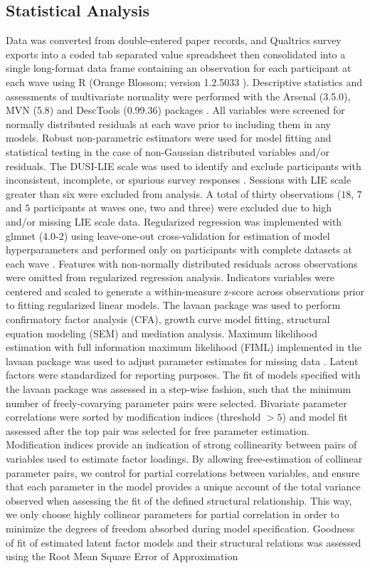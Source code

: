\documentclass[utf8]{frontiersSCNS} %
\begin{document}
\subsection{Statistical Analysis}
Data was converted from double-entered paper records, and Qualtrics survey exports into a coded tab separated value spreadsheet then consolidated into a single long-format data frame containing an observation for each participant at each wave using R (Orange Blossom; version 1.2.5033 \cite{R}). Descriptive statistics and assessments of multivariate normality were performed with the Arsenal (3.5.0), MVN (5.8) and DescTools (0.99.36) packages \citep{MVN,DescTools}. All variables were screened for normally distributed residuals at each wave prior to including them in any models. Robust non-parametric estimators were used for model fitting and statistical testing in the case of non-Gaussian distributed variables and/or residuals. The DUSI-LIE scale was used to identify and exclude participants with inconsistent, incomplete, or spurious survey responses \citep{dalla2003effects}. Sessions with LIE scale greater than six were excluded from analysis. A total of thirty observations ($18$, $7$ and $5$ participants at waves one, two and three) were excluded due to high and/or missing LIE scale data. Regularized regression was implemented with glmnet (4.0-2) using leave-one-out cross-validation for estimation of model hyperparameters and performed only on participants with complete datasets at each wave \citep{friedman2009glmnet, FriedmanHastieTibshirani2010}. Features with non-normally distributed residuals across observations were omitted from regularized regression analysis. Indicators variables were centered and scaled to generate a within-measure z-score across observations prior to fitting regularized linear models. The lavaan package was used to perform confirmatory factor analysis (CFA), growth curve model fitting, structural equation modeling (SEM) and mediation analysis. Maximum likelihood estimation with full information maximum likelihood (FIML) implemented in the lavaan package was used to adjust parameter estimates for missing data \citep{cham2017full}. Latent factors were standardized for reporting purposes. The fit of models specified with the lavaan package was assessed in a step-wise fashion, such that the minimum number of freely-covarying parameter pairs were selected. Bivariate parameter correlations were sorted by modification indices (threshold $>5$) and model fit assessed after the top pair was selected for free parameter estimation. Modification indices provide an indication of strong collinearity between pairs of variables used to estimate factor loadings. By allowing free-estimation of collinear parameter pairs, we control for partial correlations between variables, and ensure that each parameter in the model provides a unique account of the total variance observed when assessing the fit of the defined structural relationship. This way, we only choose highly collinear parameters for partial correlation in order to minimize the degrees of freedom absorbed during model specification. Goodness of fit of estimated latent factor models and their structural relations was assessed using the Root Mean Square Error of Approximation 
\end{document}

